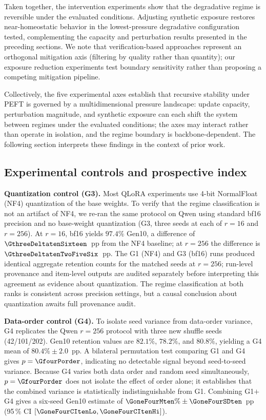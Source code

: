 \documentclass[a4paper,fleqn]{cas-dc}
\newif\ifshowchanges
\newcommand{\rev}[1]{\ifshowchanges{\color{blue}#1}\else{#1}\fi}
\begin{document}
Taken together, the intervention experiments show that the degradative regime is
reversible under the evaluated conditions. Adjusting synthetic exposure restores
near-homeostatic behavior in the \rev{lowest-pressure degradative configuration tested}, complementing the
capacity and perturbation results presented in the preceding sections. We note
that verification-based approaches \citep{yi2025} represent an orthogonal
mitigation axis (filtering by quality rather than quantity); our exposure
reduction experiments test boundary sensitivity rather than proposing a
competing mitigation pipeline.

Collectively, the five experimental axes establish that recursive stability
under PEFT is governed by a multidimensional pressure landscape: update
capacity, perturbation magnitude, and synthetic exposure \rev{can each shift} the system between regimes under the evaluated conditions; the axes may interact rather than operate in isolation, and the regime boundary is backbone-dependent. The following section
interprets these findings in the context of prior work.

\subsection{Experimental controls and prospective index}\label{sec:res_controls}

\rev{\textbf{Quantization control (G3).}
Most QLoRA experiments use 4-bit NormalFloat (NF4) quantization of the base
weights. To verify that the regime classification is not an artifact of NF4, we
re-ran the same protocol on Qwen using standard bf16 precision and no base-weight
quantization (G3, three seeds at each of $r=16$ and $r=256$). At $r=16$, bf16
yields $97.4\%$ Gen10, a difference of $\GthreeDeltatenSixteen$~pp from the NF4
baseline; at $r=256$ the difference is $\GthreeDeltatenTwoFiveSix$~pp.
The G1 (NF4) and G3 (bf16) runs produced identical aggregate retention counts
for the matched seeds at $r=256$; run-level provenance and item-level outputs
are audited separately before interpreting this agreement as evidence about
quantization. The regime classification at both ranks is consistent across
precision settings, but a causal conclusion about quantization awaits full
provenance audit.}

\rev{\textbf{Data-order control (G4).}
To isolate seed variance from data-order variance, G4 replicates the Qwen
$r=256$ protocol with three new shuffle seeds (42/101/202). Gen10 retention
values are $82.1\%$, $78.2\%$, and $80.8\%$, yielding a G4 mean of $80.4\%\pm2.0$~pp.
A bilateral permutation test comparing G1 and G4 gives $p=\GfourPorder$, indicating
no detectable signal beyond seed-to-seed variance. Because G4 varies both data
order and random seed simultaneously, $p=\GfourPorder$ does not isolate the
effect of order alone; it establishes that the combined variance is
statistically indistinguishable from G1. Combining G1$+$G4 gives a six-seed
Gen10 estimate of $\GoneFourMten\%\pm\GoneFourSDten$~pp
(95\,\% CI $[\GoneFourCItenLo, \GoneFourCItenHi]$).}
\end{document}
